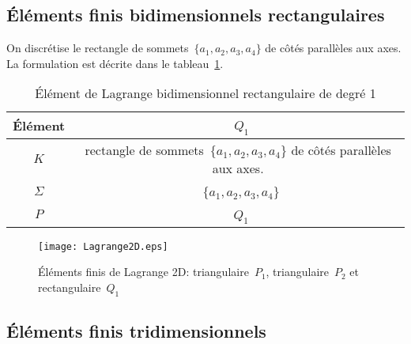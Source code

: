 \medskip
\subsection*{Éléments finis bidimensionnels rectangulaires}
On discrétise le rectangle de sommets~$\{a_1, a_2, a_3, a_4\}$ de côtés parallèles aux axes. La formulation est décrite dans le tableau~\ref{tab:Elem:bibi}.
\begin{table}[ht]\centering\small
\begin{tabular}{c|c}
Élément &~$Q_1$\\
\hline
$K$ & rectangle de sommets~$\{a_1, a_2, a_3, a_4\}$ de côtés parallèles aux axes.\\
$\Sigma$ &~$\{a_1, a_2, a_3, a_4\}$\\
$P$ &~$Q_1$\\
\hline
\end{tabular}
\caption{Élément de Lagrange bidimensionnel rectangulaire de degré 1}\label{tab:Elem:bibi}
\end{table}

\begin{figure}[ht]
\centering
\texttt{[image: Lagrange2D.eps]}
\caption{\label{Lagrange2D} Éléments finis de Lagrange 2D: triangulaire~$P_1$, triangulaire~$P_2$ et rectangulaire~$Q_1$}
\end{figure}

\medskip
\subsection*{Éléments finis tridimensionnels}

